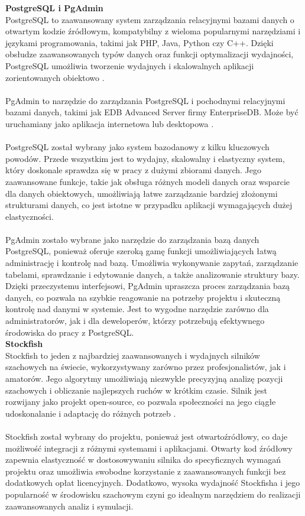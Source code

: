 \documentclass[twoside]{projektInzynierskiMS1}
\begin{document}
\noindent \textbf{PostgreSQL i PgAdmin}\\
PostgreSQL to zaawansowany system zarządzania relacyjnymi bazami danych o otwartym kodzie źródłowym, kompatybilny z wieloma popularnymi narzędziami i językami programowania, takimi jak PHP, Java, Python czy C++. Dzięki obsłudze zaawansowanych typów danych oraz funkcji optymalizacji wydajności, PostgreSQL umożliwia tworzenie wydajnych i skalowalnych aplikacji zorientowanych obiektowo \cite{PostgreSQL}.
\\\\
PgAdmin to narzędzie do zarządzania PostgreSQL i pochodnymi relacyjnymi bazami danych, takimi jak EDB Advanced Server firmy EnterpriseDB. Może być uruchamiany jako aplikacja internetowa lub desktopowa \cite{PgAdminFAQ}.
\\\\
PostgreSQL został wybrany jako system bazodanowy z kilku kluczowych powodów. Przede wszystkim jest to wydajny, skalowalny i elastyczny system, który doskonale sprawdza się w pracy z dużymi zbiorami danych. Jego zaawansowane funkcje, takie jak obsługa różnych modeli danych oraz wsparcie dla danych obiektowych, umożliwiają łatwe zarządzanie bardziej złożonymi strukturami danych, co jest istotne w przypadku aplikacji wymagających dużej elastyczności.
\\\\
PgAdmin zostało wybrane jako narzędzie do zarządzania bazą danych PostgreSQL, ponieważ oferuje szeroką gamę funkcji umożliwiających łatwą administrację i kontrolę nad bazą. Umożliwia wykonywanie zapytań, zarządzanie tabelami, sprawdzanie i edytowanie danych, a także analizowanie struktury bazy. Dzięki przeczystemu interfejsowi, PgAdmin upraszcza proces zarządzania bazą danych, co pozwala na szybkie reagowanie na potrzeby projektu i skuteczną kontrolę nad danymi w systemie. Jest to wygodne narzędzie zarówno dla administratorów, jak i dla deweloperów, którzy potrzebują efektywnego środowiska do pracy z PostgreSQL.
\\

\noindent \textbf{Stockfish}\\
Stockfish to jeden z najbardziej zaawansowanych i wydajnych silników szachowych na świecie, wykorzystywany zarówno przez profesjonalistów, jak i amatorów. Jego algorytmy umożliwiają niezwykle precyzyjną analizę pozycji szachowych i obliczanie najlepszych ruchów w krótkim czasie. Silnik jest rozwijany jako projekt open-source, co pozwala społeczności na jego ciągłe udoskonalanie i adaptację do różnych potrzeb \cite{Stockfish}. 
\\\\
Stockfish został wybrany do projektu, ponieważ jest otwartoźródłowy, co daje możliwość integracji z różnymi systemami i aplikacjami. Otwarty kod źródłowy zapewnia elastyczność w dostosowywaniu silnika do specyficznych wymagań projektu oraz umożliwia swobodne korzystanie z zaawansowanych funkcji bez dodatkowych opłat licencyjnych. Dodatkowo, wysoka wydajność Stockfisha i jego popularność w środowisku szachowym czyni go idealnym narzędziem do realizacji zaawansowanych analiz i symulacji.
\end{document}
